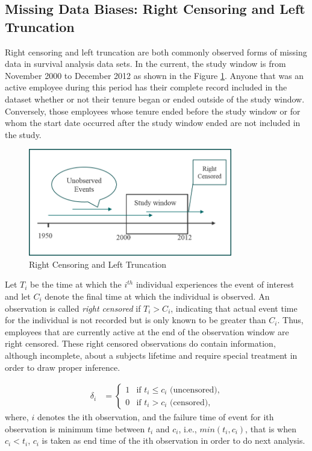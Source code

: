 \documentclass[12pt,letterpaper]{article}
\begin{document}
 \subsection{Missing Data Biases: Right Censoring and Left Truncation}\label{bias}
 Right censoring and left truncation are both commonly observed forms of missing data in survival analysis data sets. In the current, the study window is from November 2000 to December 2012 as shown in the Figure \ref{fig:1}.  Anyone that was an active employee during this period has their complete record included in the dataset whether or not their tenure began or ended outside of the study window.  Conversely, those employees whose tenure ended before the study window or for whom the start date occurred after the study window ended are not included in the study.

 \begin{figure}[htbp]
 	\centering
 	\includegraphics[width=3.5in]{fig1.png}
 	\caption{Right Censoring and Left Truncation}
 	\label{fig:1}
 \end{figure}
  Let $T_i$ be the time at which the $i^{th}$ individual experiences the event of interest and let $C_i$ denote the final time at which the individual is observed. An observation is called {\it right censored} if $T_i> C_i$, indicating that actual event time for the individual  is not recorded but is only known to be greater than $C_i$. Thus, employees that are currently active at the end of the observation window are right censored. These right censored observations do contain information, although incomplete, about a subjects lifetime and require special treatment in order to draw proper inference.

 \begin{align*}
 	\delta_i&=
 	\begin{cases}
 		1   &\text{if  }  t_i \leq c_i \text{ (uncensored),}\\
 		0   &\text{if  }  t_i > c_i \text{ (censored),}
 	\end{cases}
 \end{align*}
 where, $i$ denotes the ith observation, and the failure time of event for ith observation is minimum time between $t_i$ and $c_i$, i.e., $min(t_i, c_i)$, that is when $ c_i <t_i $, $c_i$ is taken as end time of the ith observation in order to do next  analysis.
\end{document}
